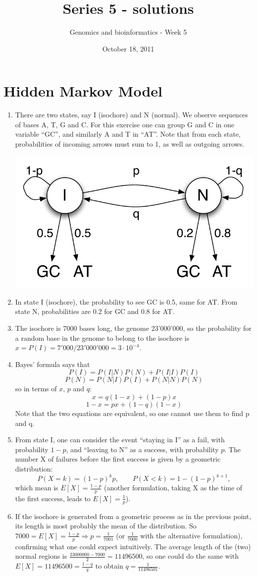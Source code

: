 \documentclass[a4paper,11pt]{article}
\title{Series 5 - solutions}
\date{October 18, 2011}
\author{Genomics and bioinformatics - Week 5}
\begin{document}
\maketitle

\section{Hidden Markov Model}
\begin{enumerate}
\item There are two states, say I (isochore) and N (normal). We observe sequences of bases A, T, G and C. For this exercise one can group G and C in one variable ``GC'', and similarly A and T in ``AT''. Note that from each state, probabilities of incoming arrows must sum to 1, as well as outgoing arrows.

\begin{center}
\includegraphics[height=0.2\textwidth]{hmm.pdf}
\end{center}

\item In state I (isochore), the probability to see GC is 0.5, same for AT. From state N, probabilities are 0.2 for GC and 0.8 for AT.
\item The isochore is 7000 bases long, the genome 23'000'000, so the probability for a random base in the genome to belong to the isochore is $x = P(I) = 7'000/23'000'000 = 3\cdot 10^{-4}$.
\item Bayes' formula says that 
$$ P(I) = P(I|N)P(N) + P(I|I)P(I) $$
$$ P(N) = P(N|I)P(I) + P(N|N)P(N) $$
so in terms of $x$, $p$ and $q$:
$$ x = q(1-x) + (1-p)x $$
$$ 1-x = px + (1-q)(1-x) $$
Note that the two equations are equivalent, so one cannot use them to find p and q.
\item From state I, one can consider the event ``staying in I'' as a fail, with probability $1-p$, and ``leaving to N'' as a success, with probability $p$. The number X of failures before the first success is given by a geometric distribution:
$$ P(X=k) = (1-p)^k p, \qquad P(X<k) = 1-(1-p)^{k+1}, $$
which mean is $E[X] = \frac{1-p}{p}$ (another formulation, taking X as the time of the first success, leads to $E[X] = \frac{1}{p}$).
\item If the isochore is generated from a geometric process as in the previous point, its length is most probably the mean of the distribution. So $7000 = E[X] = \frac{1-p}{p} \Rightarrow p = \frac{1}{7001}$ (or $\frac{1}{7000}$ with the alternative formulation), confirming what one could expect intuitively. The average length of the (two) normal regions is $\frac{23000000-7000}{2} = 11496500$, so one could do the same with $E[X] = 11496500 = \frac{1-q}{q}$ to obtain $q = \frac{1}{11496501}$.
\end{enumerate}
\end{document}
